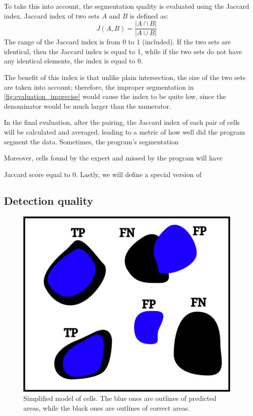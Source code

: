 \documentclass[
  digital,     %
  oneside,     %
  nosansbold,  %
  nocolorbold, %
  lof,         %
  lot,         %
]{fithesis4}
\begin{document}
To take this into account, the segmentation quality is evaluated using the
Jaccard index. Jaccard index of two sets $A$ and $B$ is defined
as\cite{2020eelbode}:
$$J(A, B) = \frac{|A \cap B|}{|A \cup B|}$$
The range of the Jaccard index is from 0 to 1 (included). If the two sets are
identical, then the Jaccard index is equal to 1, while if the two sets do not
have any identical elements, the index is equal to 0.

The benefit of this index is that unlike plain intersection, the size of the two
sets are taken into account; therefore, the improper segmentation in
\ref{fig:evaluation_imprecise} would cause the index to be quite low, since the
denominator would be much larger than the numerator.

In the final evaluation, after the pairing, the Jaccard index of each pair of
cells will be calculated and averaged, leading to a metric of how well did the
program segment the data. Sometimes, the program's segmentation 


Moreover, cells found by the expert and missed by the
program will have 


Jaccard score equal to 0. Lastly, we will define a special
version of 

\subsection{Detection quality}

\begin{figure}
    \begin{center}
        \includegraphics{resources/inkscape/evaluation_with_TP.png}
    \end{center}
    \caption{Simplified model of cells. The blue ones are
    outlines of predicted areas, while the black ones are outlines of correct
    areas.}
    \label{fig:evaluation_basic}
\end{figure}
\end{document}
